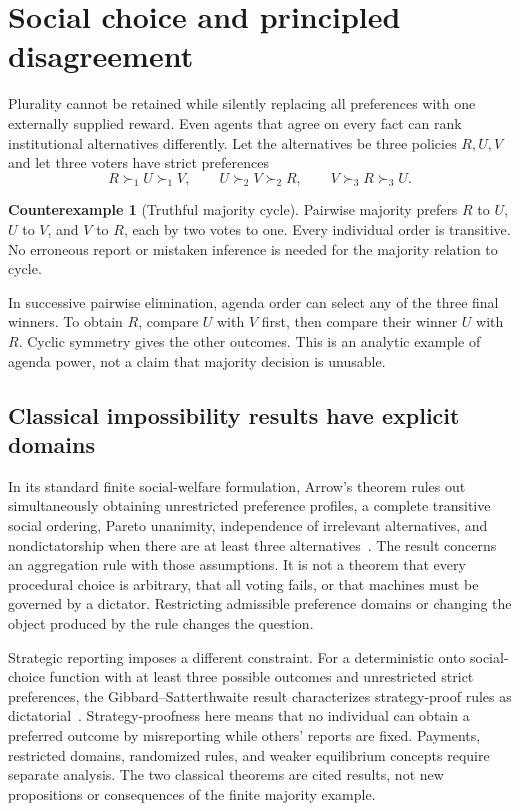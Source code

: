 \documentclass[11pt,letterpaper]{article}
\theoremstyle{plain}
\theoremstyle{definition}
\newtheorem{counterexample}[proposition]{Counterexample}
\theoremstyle{remark}
\begin{document}
\section{Social choice and principled disagreement}\label{sec:choice}
Plurality cannot be retained while silently replacing all preferences with one externally supplied reward. Even agents that agree on every fact can rank institutional alternatives differently. Let the alternatives be three policies $R,U,V$ and let three voters have strict preferences
\[
R\succ_1 U\succ_1 V,\qquad
U\succ_2 V\succ_2 R,\qquad
V\succ_3 R\succ_3 U.
\]

\begin{counterexample}[Truthful majority cycle]\label{ex:majority}
Pairwise majority prefers $R$ to $U$, $U$ to $V$, and $V$ to $R$, each by two votes to one. Every individual order is transitive. No erroneous report or mistaken inference is needed for the majority relation to cycle.
\end{counterexample}

In successive pairwise elimination, agenda order can select any of the three final winners. To obtain $R$, compare $U$ with $V$ first, then compare their winner $U$ with $R$. Cyclic symmetry gives the other outcomes. This is an analytic example of agenda power, not a claim that majority decision is unusable.

\subsection{Classical impossibility results have explicit domains}
In its standard finite social-welfare formulation, Arrow's theorem rules out simultaneously obtaining unrestricted preference profiles, a complete transitive social ordering, Pareto unanimity, independence of irrelevant alternatives, and nondictatorship when there are at least three alternatives~\cite{arrow}. The result concerns an aggregation rule with those assumptions. It is not a theorem that every procedural choice is arbitrary, that all voting fails, or that machines must be governed by a dictator. Restricting admissible preference domains or changing the object produced by the rule changes the question.

Strategic reporting imposes a different constraint. For a deterministic onto social-choice function with at least three possible outcomes and unrestricted strict preferences, the Gibbard--Satterthwaite result characterizes strategy-proof rules as dictatorial~\cite{gibbard,satterthwaite}. Strategy-proofness here means that no individual can obtain a preferred outcome by misreporting while others' reports are fixed. Payments, restricted domains, randomized rules, and weaker equilibrium concepts require separate analysis. The two classical theorems are cited results, not new propositions or consequences of the finite majority example.
\end{document}
